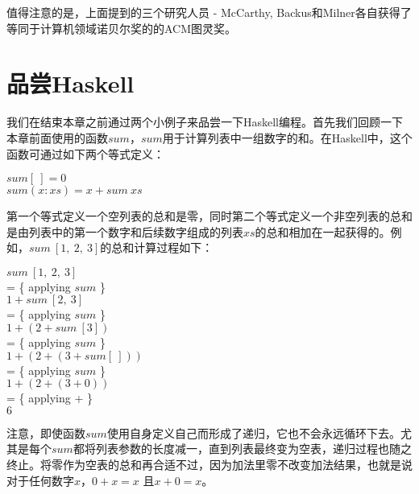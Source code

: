 值得注意的是，上面提到的三个研究人员 - McCarthy, Backus和Milner各自获得了等同于计算机领域诺贝尔奖的的ACM图灵奖。

\section{品尝Haskell}
我们在结束本章之前通过两个小例子来品尝一下Haskell编程。首先我们回顾一下本章前面使用的函数$sum$，$sum$用于计算列表中一组数字的和。在Haskell中，这个函数可通过如下两个等式定义：

\noindent\hspace*{1cm} $sum [~] = 0$\\
\hspace*{1cm} $sum (x : xs) = x + sum~xs$

第一个等式定义一个空列表的总和是零，同时第二个等式定义一个非空列表的总和是由列表中的第一个数字和后续数字组成的列表$xs$的总和相加在一起获得的。例如，$sum~[1,~2,~3]$的总和计算过程如下：

\noindent\hspace*{1cm} $sum~[1,~2,~3]$\\
\hspace*{1cm} = \{ applying $sum$ \}\\
\hspace*{1cm} $1 + sum~[2,~3]$\\
\hspace*{1cm} = \{ applying $sum$ \}\\
\hspace*{1cm} $1 + (2 + sum~[3])$\\
\hspace*{1cm} = \{ applying $sum$ \}\\
\hspace*{1cm} $1 + (2 + (3 + sum [~]))$\\
\hspace*{1cm} = \{ applying $sum$ \}\\
\hspace*{1cm} $1 + (2 + (3 + 0))$\\
\hspace*{1cm} = \{ applying + \}\\
\hspace*{1cm} $6$

注意，即使函数$sum$使用自身定义自己而形成了递归，它也不会永远循环下去。尤其是每个$sum$都将列表参数的长度减一，直到列表最终变为空表，递归过程也随之终止。将零作为空表的总和再合适不过，因为加法里零不改变加法结果，也就是说对于任何数字$x$，$0
+ x = x$ 且$x + 0 = x$。


